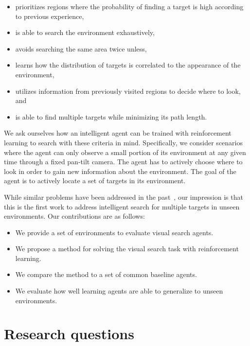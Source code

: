 \begin{itemize}
  \item prioritizes regions where the probability of finding a target is high according to previous experience,
  \item is able to search the environment exhaustively,
  \item avoids searching the same area twice unless,
  \item learns how the distribution of targets is correlated to the appearance of the environment,
  \item utilizes information from previously visited regions to decide where to look, and
  \item is able to find multiple targets while minimizing its path length. %
\end{itemize}

We ask ourselves how an intelligent agent can be trained with reinforcement learning to search with these criteria in mind.
Specifically, we consider scenarios where the agent can only observe a small portion of its environment at any given time through a fixed pan-tilt camera.
The agent has to actively choose where to look in order to gain new information about the environment.
The goal of the agent is to actively locate a set of targets in its environment.

While similar problems have been addressed in the past~\cite{minut_mahadevan_2001}, our impression is that this is the first work to address intelligent search for multiple targets in unseen environments.
Our contributions are as follows:

\begin{itemize}
  \item We provide a set of environments to evaluate visual search agents.
  \item We propose a method for solving the visual search task with reinforcement learning.
  \item We compare the method to a set of common baseline agents.
  \item We evaluate how well learning agents are able to generalize to unseen environments.
\end{itemize}

\section{Research questions}
\label{sec:research-questions}

